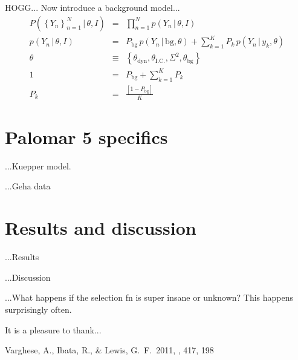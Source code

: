 \documentclass[12pt,pdftex,preprint]{aastex}
\newcommand{\setof}[1]{\left\{{#1}\right\}}
\newcommand{\given}{\,|\,}
\newcommand{\bg}{\mathrm{bg}}
\newcommand{\dyn}{\mathrm{dyn}}
\newcommand{\ic}{\mathrm{I.C.}}
\begin{document}
HOGG... Now introduce a background model...
\begin{eqnarray}
P(\setof{Y_n}_{n=1}^N\given\theta,I) &=& \prod_{n=1}^N p(Y_n\given\theta,I)
\\
p(Y_n\given\theta,I) &=& P_\bg\,p(Y_n\given \bg,\theta) + \sum_{k=1}^K P_k\,p(Y_n\given y_k,\theta)
\\
\theta &\equiv& \setof{\theta_\dyn, \theta_\ic, \Sigma^2, \theta_\bg}
\\
1 &=& P_\bg + \sum_{k=1}^K P_k
\\
P_k &=& \frac{[1 - P_\bg]}{K}
\end{eqnarray}

\section{Palomar 5 specifics}

...Kuepper model.

...Geha data

\section{Results and discussion}

...Results

...Discussion

...What happens if the selection fn is super insane or unknown?  This
happens surprisingly often.

\acknowledgements It is a pleasure to thank...

\begin{thebibliography}{}
Varghese, A., Ibata, R., \& Lewis, G.~F.\ 2011, \mnras, 417, 198 
\end{thebibliography}
\end{document}
